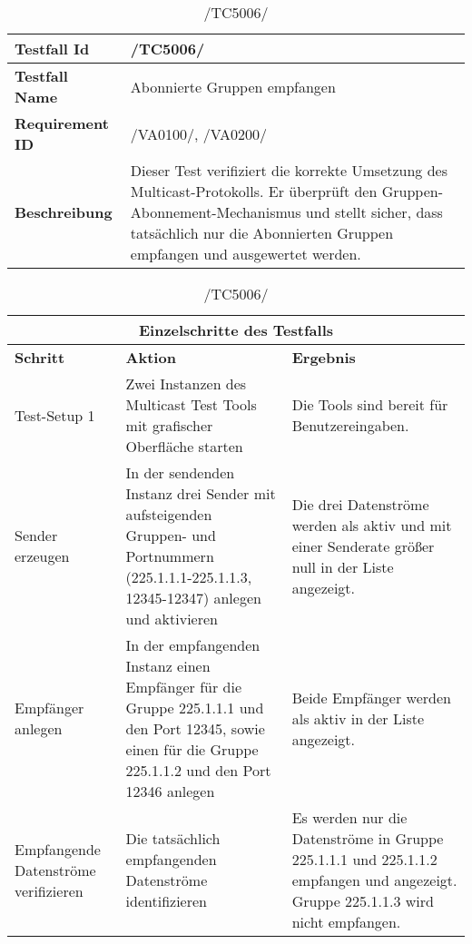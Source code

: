     \begin{table}[h]
        \caption{/TC5006/}
        \label{tab:TC5006}
        \begin{center}
            \begin{tabular}{|p{3.5cm}|p{12cm}|}
                \hline
                    \textbf{Testfall Id} & /TC5006/\\
                \hline
                    \textbf{Testfall Name} & Abonnierte Gruppen empfangen
                    \\
                \hline
                    \textbf{Requirement ID} & /VA0100/, /VA0200/\\
                \hline
                    \textbf{Beschreibung} &  Dieser Test verifiziert die
                    korrekte Umsetzung des Multicast-Protokolls. Er überprüft
                    den Gruppen-Abonnement-Mechanismus und stellt sicher, dass
                    tatsächlich nur die Abonnierten Gruppen empfangen und
                    ausgewertet werden.\\
                \hline
            \end{tabular}
            \begin{tabular}{|p{3.5cm}|p{5cm}|p{6.55cm}|}
                \multicolumn{3}{|c|}{\textbf{Einzelschritte des Testfalls}} \\
                \hline
                    \textbf{Schritt} & \textbf{Aktion} & \textbf{Ergebnis}\\
                \hline
                    Test-Setup 1 &
                    Zwei Instanzen des Multicast Test Tools mit grafischer
                    Oberfläche starten &
                    Die Tools sind bereit für Benutzereingaben.\\
                \hline
                    Sender erzeugen &
                    In der sendenden Instanz drei Sender mit aufsteigenden
                    Gruppen- und Portnummern (225.1.1.1-225.1.1.3, 12345-12347)
                    anlegen und aktivieren &
                    Die drei Datenströme werden als aktiv und mit einer
                    Senderate größer null in der Liste angezeigt.\\
                \hline
                    Empfänger anlegen &
                    In der empfangenden Instanz einen Empfänger für die Gruppe
                    225.1.1.1 und den Port 12345, sowie einen für die Gruppe
                    225.1.1.2 und den Port 12346 anlegen &
                    Beide Empfänger werden als aktiv in der Liste angezeigt.\\
                \hline
                    Empfangende Datenströme verifizieren &
                    Die tatsächlich empfangenden Datenströme identifizieren & 
                    Es werden nur die Datenströme in Gruppe 225.1.1.1 und
                    225.1.1.2 empfangen und angezeigt. Gruppe 225.1.1.3 wird
                    nicht empfangen.\\
                \hline
            \end{tabular}
        \end{center}
    \end{table}